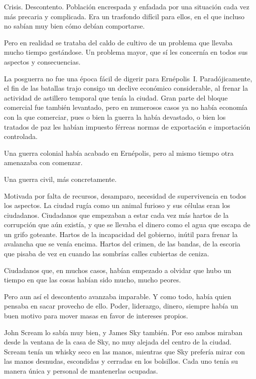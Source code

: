 Crisis. Descontento. Población encrespada y enfadada por una situación cada vez más precaria y complicada. Era un trasfondo difícil para ellos, en el que incluso no sabían muy bien cómo debían comportarse.

Pero en realidad se trataba del caldo de cultivo de un problema que llevaba mucho tiempo gestándose. Un problema mayor, que sí les concernía en todos sus aspectos y consecuencias.

\fancyparbreak
La posguerra no fue una época fácil de digerir para Ernépolis~I. Paradójicamente, el fin de las batallas trajo consigo un declive económico considerable, al frenar la actividad de astillero temporal que tenía la ciudad. Gran parte del bloque comercial fue también levantado, pero en numerosos casos ya no había economía con la que comerciar, pues o bien la guerra la había devastado, o bien los tratados de paz les habían impuesto férreas normas de exportación e importación controlada.

Una guerra colonial había acabado en Ernépolis, pero al mismo tiempo otra amenazaba con comenzar.

Una guerra civil, más concretamente.

Motivada por falta de recursos, desamparo, necesidad de supervivencia en todos los aspectos. La ciudad rugía como un animal furioso y sus células eran los ciudadanos. Ciudadanos que empezaban a estar cada vez más hartos de la corrupción que aún existía, y que se llevaba el dinero como el agua que escapa de un grifo goteante. Hartos de la incapacidad del gobierno, inútil para frenar la avalancha que se venía encima. Hartos del crimen, de las bandas, de la escoria que pisaba de vez en cuando las sombrías calles cubiertas de ceniza.

Ciudadanos que, en muchos casos, habían empezado a olvidar que hubo un tiempo en que las cosas habían sido mucho, mucho peores.

Pero aun así el descontento avanzaba imparable. Y como todo, había quien pensaba en sacar provecho de ello. Poder, liderazgo, dinero, siempre había un buen motivo para mover masas en favor de intereses propios.

John Scream lo sabía muy bien, y James Sky también. Por eso ambos miraban desde la ventana de la casa de Sky, no muy alejada del centro de la ciudad. Scream tenía un whisky seco en las manos, mientras que Sky prefería mirar con las manos desnudas, escondidas y cerradas en los bolsillos. Cada uno tenía su manera única y personal de mantenerlas ocupadas.

